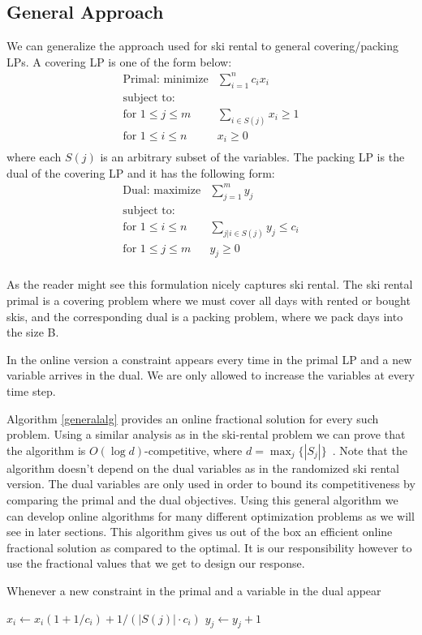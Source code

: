 \subsection{General Approach}
We can generalize the approach used for ski rental to general covering/packing LPs. A covering LP is one of the form below:
\[
	\begin{array}{lr}
	\textrm{Primal: minimize}   & \sum_{i=1}^n c_i x_i   \\
	\textrm{subject to:} & \\
	\textrm{for $1 \le j \le m$} & \sum_{i \in S(j)} x_i  \ge 1  \\
	\textrm{for $1 \le i \le n$} & x_i  \ge 0  \\
	\end{array}
\]
where each $S(j)$ is an arbitrary subset of the variables.
The packing LP is the dual of the covering LP and it has the following form:
\[
	\begin{array}{lr}
	\textrm{Dual: maximize}   & \sum_{j=1}^m y_j   \\
	\textrm{subject to:} & \\
	\textrm{for $1 \le i \le n$} & \sum_{j | i \in S(j)} y_j  \le c_i  \\
	\textrm{for $1 \le j \le m$} & y_j \ge 0  \\
	\end{array}
\]

As the reader might see this formulation nicely captures ski rental.
The ski rental primal is a covering problem where we must cover all days with rented or bought skis, and the corresponding dual is a packing problem, where we pack days into the size B.

In the online version a constraint appears every time in the primal LP and a new variable arrives in the dual. We are only allowed to increase the variables at every time step.

Algorithm \ref{generalalg} provides an online fractional solution for every such problem. Using a similar analysis as in the ski-rental problem we can prove that the algorithm is $O(\log d)$-competitive, where \mbox{$d = \max_j\{|S_j|\}$}~\cite{buchbinder09:survey}.
Note that the algorithm doesn't depend on the dual variables as in the randomized ski rental version. The dual variables are only used in order to bound its competitiveness by comparing the primal and the dual objectives.
Using this general algorithm we can develop online algorithms for many different optimization problems as we will see in later sections. This algorithm gives us out of the box an efficient online fractional solution as compared to the optimal. It is our responsibility however to use the fractional values that we get to design our response.

\begin{algorithm}
\label{generalalg}
\caption{Whenever a new constraint in the primal and a variable in the dual appear}
\begin{algorithmic}[1]
    \STATE $x_i \leftarrow x_i (1 + 1/c_i) + 1/(|S(j)| \cdot c_i)$ 
  \ENDFOR
  \STATE $y_j \leftarrow y_j + 1$
\ENDWHILE
\end{algorithmic}
\end{algorithm}


